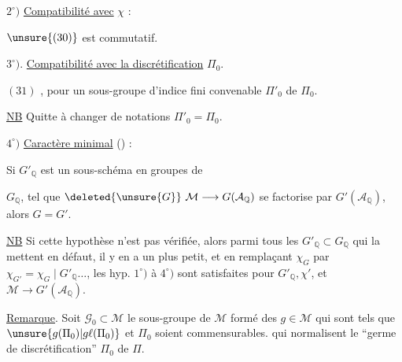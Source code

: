 \(2^\circ)\) \uline{Compatibilité avec} \(\chi\) :

\(\unsure{(30)}\)
est commutatif.

\(3^\circ)\). \uline{Compatibilité avec la discrétification} \(\Pi_0\).

\((31)\)
,
pour un sous-groupe d'indice fini convenable \(\Pi'_0\) de \(\Pi_0\).

\uline{NB} Quitte à changer de notations  \(\Pi'_0=\Pi_0\).

\(4^\circ)\) \uline{Caractère minimal} () :

Si \(G'_{\mathbb{Q}}\) est un sous-schéma en groupes de


\(G_{\mathbb{Q}}\), tel que \(\deleted{\unsure{G}}\ \mathcal{M}\longrightarrow G(\mathcal{A}_{\mathbb{Q}})\) se factorise par \(G'(\mathcal{A}_{\mathbb{Q}})\), alors \(G=G'\).

\uline{NB} Si cette hypothèse n'est pas vérifiée, alors parmi tous les \(G'_{\mathbb{Q}}\subset G_{\mathbb{Q}}\) qui la mettent en défaut, il y en a un  plus petit, et en remplaçant \(\chi_G\) par \(\chi_{G'}=\chi_G\mid G'_{\mathbb{Q}}\ldots\), les hyp. \(1^\circ)\) à \(4^\circ)\) sont satisfaites pour \(G'_{\mathbb{Q}},\chi'\), et \(\mathcal{M}\longrightarrow G'(\mathcal{A}_{\mathbb{Q}})\).

\uline{Remarque}. Soit \(\mathcal{G}_0\subset\mathcal{M}\) le sous-groupe de \(\mathcal{M}\) formé des \(g\in\mathcal{M}\) qui sont tels que \(\unsure{g(\Pi_0)|g\ell(\Pi_0)}\) et \(\Pi_0\) soient commensurables.   qui normalisent le ``germe de discrétification'' \(\Pi_0\) de \(\Pi\).

